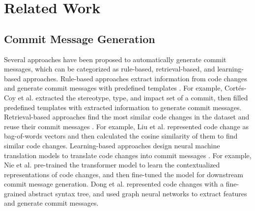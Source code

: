 \section{Related Work}
\subsection{Commit Message Generation}
Several approaches have been proposed to automatically generate commit messages, which can be categorized as rule-based, retrieval-based, and learning-based approaches.
Rule-based approaches extract information from code changes and generate commit messages with predefined templates \cite{buse2010automatically, cortes2014automatically, linares2015changescribe, shen2016automatic}. For example, Cortés-Coy et al. \cite{cortes2014automatically} extracted the stereotype, type, and impact set of a commit, then filled predefined templates with extracted information to generate commit messages.
Retrieval-based approaches find the most similar code changes in the dataset and reuse their commit messages \cite{huang2017mining, liu2018neural, huang2020learning}. For example, Liu et al. \cite{liu2018neural} represented code change as bag-of-words vectors and then calculated the cosine similarity of them to find similar code changes.
Learning-based approaches design neural machine translation models to translate code changes into commit messages \cite{liu2020atom, nie2021coregen, wang2021context, dong2022fira, jung2021commitbert, shi2022race, he2023come, tao2024kadel, lin2023cct5, loyola2017neural, jiang2017automatically, xu2019commit, liu2019generating}.
For example,
Nie et al. \cite{nie2021coregen} pre-trained the transformer model to learn the contextualized representations of code changes, and then fine-tuned the model for downstream commit message generation.
Dong et al. \cite{dong2022fira} represented code changes with a fine-grained abstract syntax tree, and used graph neural networks to extract features and generate commit messages.

